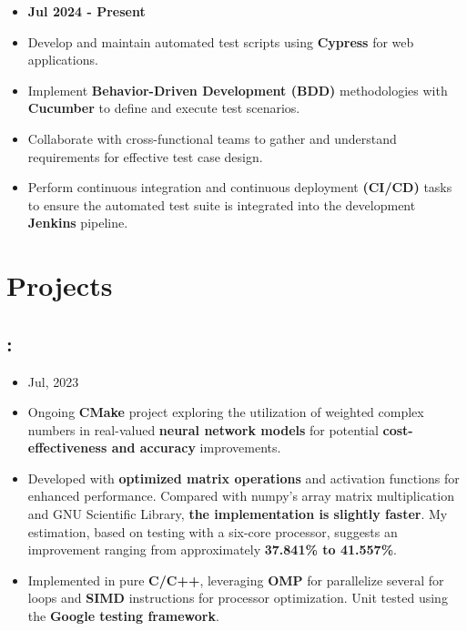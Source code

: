 \documentclass[11pt]{article}
\begin{document}
\begin{itemize}[noitemsep, nolistsep]
\item \textbf{Jul 2024 - Present}
\item Develop and maintain automated test scripts using \textbf{Cypress} for web applications.
\item Implement\textbf{ Behavior-Driven Development (BDD)} methodologies with \textbf{Cucumber} to define
  and execute test scenarios.
\item Collaborate with cross-functional teams to gather and understand requirements for effective test case
  design.
\item Perform continuous integration and continuous deployment \textbf{(CI/CD)} tasks to ensure
  the automated test suite is integrated into the development \textbf{Jenkins} pipeline.
\end{itemize}
\vspace{-0.4cm}

\section*{Projects}
\vspace{-0.4cm}
\titlerule[0.3pt]
\vspace{0.1cm}


\subsection*{\href{https://github.com/alecksandr26/cnet}{\color{blue}{Complex Neural Networks Framework From Scratch}}:}
\vspace{-0.3cm}
\begin{itemize}[noitemsep, nolistsep]
\item Jul, 2023
\item Ongoing \textbf{CMake} project exploring the utilization of weighted complex numbers in real-valued
  \textbf{neural network models} for potential \textbf{cost-effectiveness and accuracy} improvements.
\item Developed with \textbf{optimized matrix operations} and activation functions for enhanced performance.
  Compared with numpy's array matrix multiplication and GNU Scientific Library,
  \textbf{the implementation is slightly faster}.
  My estimation, based on testing with a six-core processor, suggests an improvement ranging from
  approximately \textbf{37.841\% to 41.557\%}.
\item Implemented in pure \textbf{C/C++}, leveraging \textbf{OMP} for parallelize several for loops
  and \textbf{SIMD} instructions for processor optimization. Unit tested using the
  \textbf{Google testing framework}.
\end{itemize}
\vspace{-0.3cm}
\end{document}
